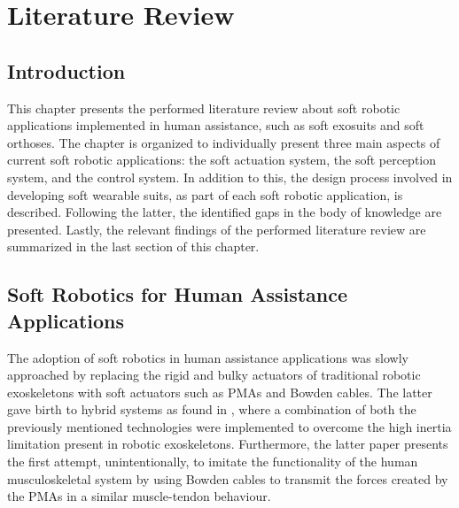 \chapter{Literature Review}

\section{Introduction}

This chapter presents the performed literature review about soft robotic applications implemented in human assistance, such as soft exosuits and soft orthoses. The chapter is organized to individually present three main aspects of current soft robotic applications: the soft actuation system, the soft perception system, and the control system. In addition to this, the design process involved in developing soft wearable suits, as part of each soft robotic application, is described. Following the latter, the identified gaps in the body of knowledge are presented. Lastly, the relevant findings of the performed literature review are summarized in the last section of this chapter.

\section{Soft Robotics for Human Assistance Applications}

The adoption of soft robotics in human assistance applications was slowly approached by replacing the rigid and bulky actuators of traditional robotic exoskeletons with soft actuators such as PMAs and Bowden cables. The latter gave birth to hybrid systems as found in \cite{Noda2014}, where a combination of both the previously mentioned technologies were implemented to overcome the high inertia limitation present in robotic exoskeletons. Furthermore, the latter paper presents the first attempt, unintentionally, to imitate the functionality of the human musculoskeletal system by using Bowden cables to transmit the forces created by the PMAs in a similar muscle-tendon behaviour. 

